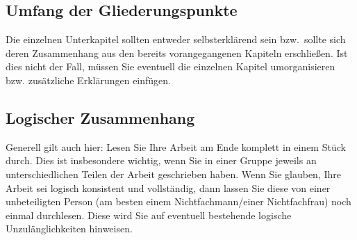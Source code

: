 \subsection{Umfang der Gliederungspunkte}
Die einzelnen Unterkapitel sollten entweder selbsterklärend sein bzw.~sollte sich deren Zusammenhang aus den bereits vorangegangenen Kapiteln erschließen.
Ist dies nicht der Fall, müssen Sie eventuell die einzelnen Kapitel umorganisieren bzw. zusätzliche Erklärungen einfügen.

\subsection{Logischer Zusammenhang}
Generell gilt auch hier: Lesen Sie Ihre Arbeit am Ende komplett in einem Stück durch.
Dies ist insbesondere wichtig, wenn Sie in einer Gruppe jeweils an unterschiedlichen Teilen der Arbeit geschrieben haben.
Wenn Sie glauben, Ihre Arbeit sei logisch konsistent und vollständig, dann lassen Sie diese von einer unbeteiligten Person (am besten einem Nichtfachmann/einer Nichtfachfrau) noch einmal durchlesen.
Diese wird Sie auf eventuell bestehende logische Unzulänglichkeiten hinweisen.
